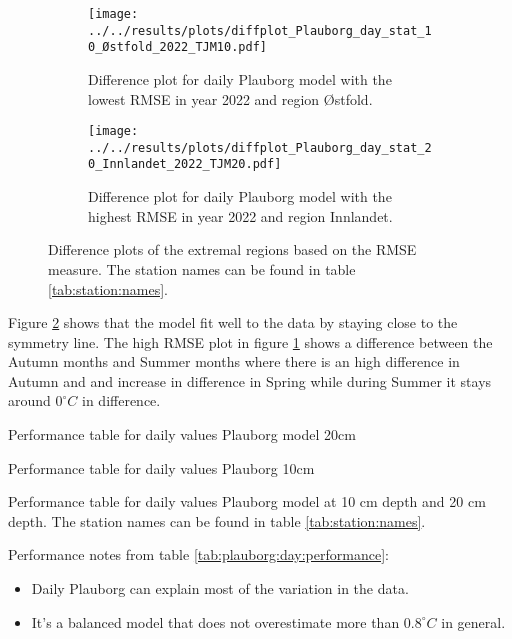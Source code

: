 \begin{figure}
	\begin{subfigure}{0.45\textwidth}
		\centering
		\texttt{[image: ../../results/plots/diffplot\_Plauborg\_day\_stat\_10\_Østfold\_2022\_TJM10.pdf]}
		\caption[Difference plot of daily Plauborg model with lowest RMSE]{Difference plot for daily Plauborg model with the lowest RMSE in year 2022 and region Østfold.}
	\end{subfigure}
	\hfill
	\begin{subfigure}{0.45\textwidth}
		\centering
		\texttt{[image: ../../results/plots/diffplot\_Plauborg\_day\_stat\_20\_Innlandet\_2022\_TJM20.pdf]}
		\caption[Difference plot of hourly PLauborg model with highest RMSE]{Difference plot for daily Plauborg model with the highest RMSE in year 2022 and region Innlandet.}
		\label{fig:playborg:day:worst}
	\end{subfigure}
		\caption[Difference plots of extremal regions daily Plauborg]{Difference plots of the extremal regions based on the RMSE measure. The station names can be found in table \ref{tab:station:names}.}
		\label{fig:plauborg:day:bestworst}
\end{figure}

Figure \ref{fig:plauborg:day:bestworst} shows that the model fit well to the data by staying close to the symmetry line. 
The high RMSE plot in figure \ref{fig:playborg:day:worst} shows a difference between the Autumn months and Summer months where there is an high difference in Autumn and and increase in difference in Spring while during Summer it stays around $0^\circ C$ in difference.

\begin{table}
	\begin{subtable}{0.8\textwidth}
		
		\caption{Performance table for daily values Plauborg model 20cm}
	\end{subtable}
	\vfill
	\begin{subtable}{0.8\textwidth}
		
		\caption{Performance table for daily values Plauborg 10cm}
	\end{subtable}
	\caption{Performance table for daily values Plauborg model at 10 cm depth and 20 cm depth. The station names can be found in table \ref{tab:station:names}.}
	\label{tab:plauborg:day:performance}
\end{table}

Performance notes from table \ref{tab:plauborg:day:performance}:
\begin{itemize}
	\item Daily Plauborg can explain most of the variation in the data.
	\item It's a balanced model that does not overestimate more than $0.8^\circ C$ in general.
\end{itemize}

